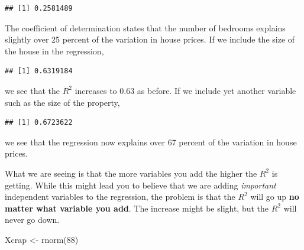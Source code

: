\documentclass[
]{book}
\newenvironment{Shaded}{\begin{snugshade}}{\end{snugshade}}
\newcommand{\AttributeTok}[1]{\textcolor[rgb]{0.77,0.63,0.00}{#1}}
\newcommand{\DecValTok}[1]{\textcolor[rgb]{0.00,0.00,0.81}{#1}}
\newcommand{\FunctionTok}[1]{\textcolor[rgb]{0.00,0.00,0.00}{#1}}
\newcommand{\NormalTok}[1]{#1}
\newcommand{\OtherTok}[1]{\textcolor[rgb]{0.56,0.35,0.01}{#1}}
\newcommand{\SpecialCharTok}[1]{\textcolor[rgb]{0.00,0.00,0.00}{#1}}
\begin{document}
\begin{verbatim}
## [1] 0.2581489
\end{verbatim}

The coefficient of determination states that the number of bedrooms explains slightly over 25 percent of the variation in house prices. If we include the size of the house in the regression,

\begin{Shaded}
\end{Shaded}

\begin{verbatim}
## [1] 0.6319184
\end{verbatim}

we see that the \(R^2\) increases to 0.63 as before. If we include yet another variable such as the size of the property,

\begin{Shaded}
\end{Shaded}

\begin{verbatim}
## [1] 0.6723622
\end{verbatim}

we see that the regression now explains over 67 percent of the variation in house prices.

What we are seeing is that the more variables you add the higher the \(R^2\) is getting. While this might lead you to believe that we are adding \emph{important} independent variables to the regression, the problem is that the \(R^2\) will go up \textbf{no matter what variable you add}. The increase might be slight, but the \(R^2\) will never go down.

\begin{Shaded}
\begin{Highlighting}[]
\NormalTok{Xcrap }\OtherTok{\textless{}{-}} \FunctionTok{rnorm}\NormalTok{(}\DecValTok{88}\NormalTok{)}
\end{Highlighting}
\end{Shaded}
\end{document}
